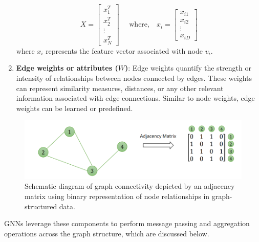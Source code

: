 \begin{enumerate}
\begin{equation*}
  X = \begin{bmatrix} x_1^T \\ x_2^T \\ \vdots \\ x_N^T \end{bmatrix} \quad \text{ where,} \quad x_i = \begin{bmatrix} x_{i1} \\ x_{i2} \\ \vdots \\ x_{iD} \end{bmatrix}
\end{equation*}
where \( x_i \) represents the feature vector associated with node \(v_i \).
  \item \textbf{Edge weights or attributes (\(W\))}: Edge weights quantify the strength or intensity of relationships between nodes connected by edges. These weights can represent similarity measures, distances, or any other relevant information associated with edge connections. Similar to node weights, edge weights can be learned or predefined. 
\end{enumerate}  
\begin{figure}[ht]
  \centering
  \includegraphics[width=12cm]{images/Theory-DL/AdjMat.png}
  \caption{Schematic diagram of graph connectivity depicted by an adjacency matrix using binary representation of node relationships in graph-structured data.}
  \label{fig:AdjMat}
\end{figure}
GNNs leverage these components to perform message passing and aggregation operations across the graph structure, which are discussed below. \\
